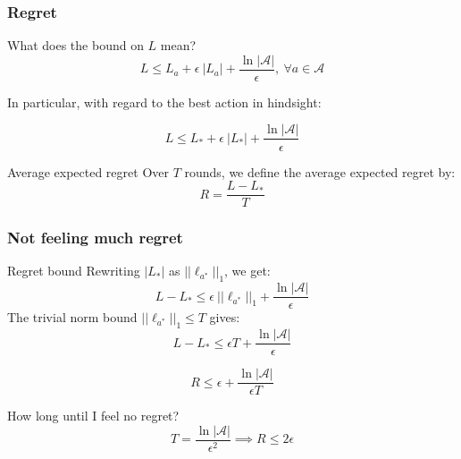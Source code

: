 \documentclass{beamer}
\begin{document}
\begin{frame}
    \frametitle{Regret}

    \begin{block}{What does the bound on $L$ mean?}
    \begin{equation*}
    L \leq L_a + \epsilon~|L_a|
    +\frac{\ln |\mathcal{A}|}{\epsilon},~ \forall a\in \mathcal{A}
    \end{equation*}

    In particular, with regard to the best action in hindsight:

    \begin{equation*}
    L \leq L_* + \epsilon~|L_*| +\frac{\ln |\mathcal{A}|}{\epsilon}
    \end{equation*}
    \end{block}

    \begin{block}{Average expected regret}
        Over $T$ rounds, we define the average expected regret by:
        \begin{equation*}
            R = \frac{L - L_*}{T}
        \end{equation*}
    \end{block}

\end{frame}

\begin{frame}
    \frametitle{Not feeling much regret}

    \begin{block}{Regret bound}
        Rewriting $|L_*|$ as $||\ell_{a^*}||_1$, we get:
    \begin{equation*}
    L - L_* \leq \epsilon~||\ell_{a^*}||_1 + \frac{\ln |\mathcal{A}|}{\epsilon}
    \end{equation*}
    The trivial norm bound $||\ell_{a^*}||_1 \leq T$ gives:
    \begin{equation*}
    L - L_* \leq \epsilon T + \frac{\ln |\mathcal{A}|}{\epsilon}
    \end{equation*}

    \begin{equation*}
    R \leq \epsilon + \frac{\ln |\mathcal{A}|}{\epsilon T}
    \end{equation*}
    \end{block}

    \begin{block}{How long until I feel no regret?}
        \begin{equation*}
            T = \frac{\ln{|\mathcal{A}|}}{\epsilon^2} \implies R \leq 2
            \epsilon
        \end{equation*}

    \end{block}

\end{frame}
\end{document}
